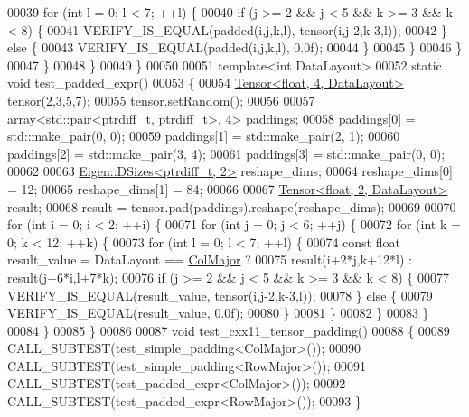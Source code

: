 \begin{DoxyCode}
00039         \textcolor{keywordflow}{for} (\textcolor{keywordtype}{int} l = 0; l < 7; ++l) \{
00040           \textcolor{keywordflow}{if} (j >= 2 && j < 5 && k >= 3 && k < 8) \{
00041             VERIFY\_IS\_EQUAL(padded(i,j,k,l), tensor(i,j-2,k-3,l));
00042           \} \textcolor{keywordflow}{else} \{
00043             VERIFY\_IS\_EQUAL(padded(i,j,k,l), 0.0f);
00044           \}
00045         \}
00046       \}
00047     \}
00048   \}
00049 \}
00050 
00051 \textcolor{keyword}{template}<\textcolor{keywordtype}{int} DataLayout>
00052 \textcolor{keyword}{static} \textcolor{keywordtype}{void} test\_padded\_expr()
00053 \{
00054   \hyperlink{class_eigen_1_1_tensor}{Tensor<float, 4, DataLayout>} tensor(2,3,5,7);
00055   tensor.setRandom();
00056 
00057   array<std::pair<ptrdiff\_t, ptrdiff\_t>, 4> paddings;
00058   paddings[0] = std::make\_pair(0, 0);
00059   paddings[1] = std::make\_pair(2, 1);
00060   paddings[2] = std::make\_pair(3, 4);
00061   paddings[3] = std::make\_pair(0, 0);
00062 
00063   \hyperlink{struct_eigen_1_1_d_sizes}{Eigen::DSizes<ptrdiff\_t, 2>} reshape\_dims;
00064   reshape\_dims[0] = 12;
00065   reshape\_dims[1] = 84;
00066 
00067   \hyperlink{class_eigen_1_1_tensor}{Tensor<float, 2, DataLayout>} result;
00068   result = tensor.pad(paddings).reshape(reshape\_dims);
00069 
00070   \textcolor{keywordflow}{for} (\textcolor{keywordtype}{int} i = 0; i < 2; ++i) \{
00071     \textcolor{keywordflow}{for} (\textcolor{keywordtype}{int} j = 0; j < 6; ++j) \{
00072       \textcolor{keywordflow}{for} (\textcolor{keywordtype}{int} k = 0; k < 12; ++k) \{
00073         \textcolor{keywordflow}{for} (\textcolor{keywordtype}{int} l = 0; l < 7; ++l) \{
00074           \textcolor{keyword}{const} \textcolor{keywordtype}{float} result\_value = DataLayout == \hyperlink{group__enums_ggaacded1a18ae58b0f554751f6cdf9eb13a0cbd4bdd0abcfc0224c5fcb5e4f6669a}{ColMajor} ?
00075               result(i+2*j,k+12*l) : result(j+6*i,l+7*k);
00076           \textcolor{keywordflow}{if} (j >= 2 && j < 5 && k >= 3 && k < 8) \{
00077             VERIFY\_IS\_EQUAL(result\_value, tensor(i,j-2,k-3,l));
00078           \} \textcolor{keywordflow}{else} \{
00079             VERIFY\_IS\_EQUAL(result\_value, 0.0f);
00080           \}
00081         \}
00082       \}
00083     \}
00084   \}
00085 \}
00086 
00087 \textcolor{keywordtype}{void} test\_cxx11\_tensor\_padding()
00088 \{
00089   CALL\_SUBTEST(test\_simple\_padding<ColMajor>());
00090   CALL\_SUBTEST(test\_simple\_padding<RowMajor>());
00091   CALL\_SUBTEST(test\_padded\_expr<ColMajor>());
00092   CALL\_SUBTEST(test\_padded\_expr<RowMajor>());
00093 \}
\end{DoxyCode}
